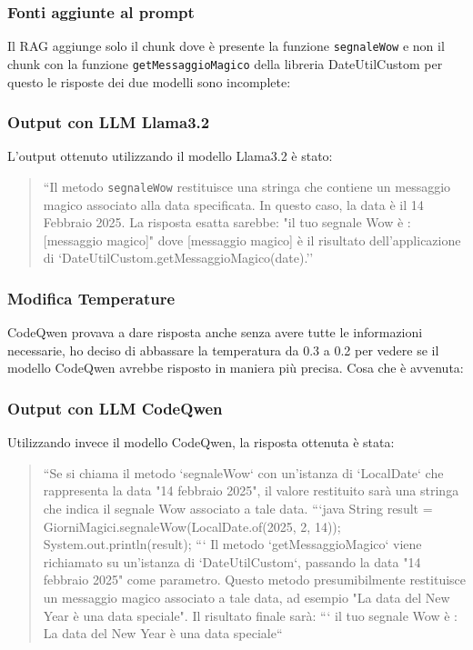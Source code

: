 \documentclass[12pt,a4paper,openright,twoside]{book}
\begin{document}
\subsubsection{Fonti aggiunte al prompt}
Il RAG aggiunge solo il chunk dove è presente la funzione \texttt{segnaleWow} e non il chunk con la funzione \texttt{getMessaggioMagico} della libreria DateUtilCustom
per questo le risposte dei due modelli sono incomplete:
\subsubsection{Output con LLM Llama3.2}
L'output ottenuto utilizzando il modello Llama3.2 è stato:
\begin{quote}
    ``Il metodo \texttt{segnaleWow} restituisce una stringa che contiene un messaggio magico associato alla data specificata. In questo caso, la data è il 14 Febbraio 2025.
La risposta esatta sarebbe:
"il tuo segnale Wow è : [messaggio magico]"
dove [messaggio magico] è il risultato dell'applicazione di `DateUtilCustom.getMessaggioMagico(date).''
\end{quote}

\subsubsection{Modifica Temperature}
CodeQwen provava a dare risposta anche senza avere tutte le informazioni necessarie, ho deciso di abbassare la temperatura da 0.3 a 0.2 per vedere se il modello CodeQwen avrebbe risposto in maniera più precisa.
Cosa che è avvenuta:

\subsubsection{Output con LLM CodeQwen}
Utilizzando invece il modello CodeQwen, la risposta ottenuta è stata:
\begin{quote}
    ``Se si chiama il metodo `segnaleWow` con un'istanza di `LocalDate` che rappresenta la data "14 febbraio 2025", il valore restituito sarà una stringa che indica il segnale Wow associato a tale data.
    ```java
    String result = GiorniMagici.segnaleWow(LocalDate.of(2025, 2, 14));
    System.out.println(result);
    ```
    Il metodo `getMessaggioMagico` viene richiamato su un'istanza di `DateUtilCustom`, passando la data "14 febbraio 2025" come parametro. Questo metodo presumibilmente restituisce un messaggio magico associato a tale data, ad esempio "La data del New Year è una data speciale".
    Il risultato finale sarà:
    ```
    il tuo segnale Wow è : La data del New Year è una data speciale``
\end{quote}
\end{document}
